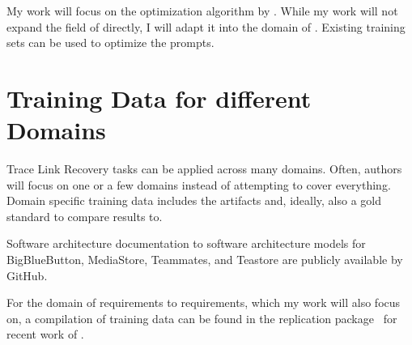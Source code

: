 My work will focus on the optimization algorithm by \citeauthor{pryzant2023AutomaticPrompt}. 
While my work will not expand the field of \APE directly, I will adapt it into the domain of \TLR. 
Existing training sets can be used to optimize the prompts.

\section{Training Data for different Domains}
Trace Link Recovery tasks can be applied across many domains.
Often, authors will focus on one or a few domains instead of attempting to cover everything.
Domain specific training data includes the artifacts and, ideally, also a gold standard to compare results to.


Software architecture documentation to software architecture models for BigBlueButton, MediaStore, Teammates, and Teastore are publicly available by  GitHub.

For the domain of requirements to requirements, which my work will also focus on, a compilation of training data can be found in the replication package~\cite{hey2025ReplicationPackage} for recent work of \citeauthor{hey2025RequirementsTraceability}.